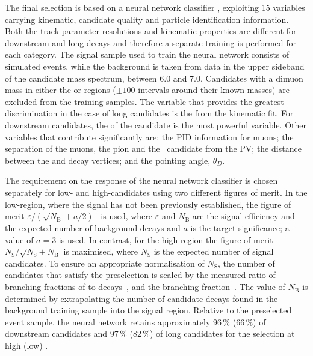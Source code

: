  The final selection is based on a neural network classifier
 \cite{Feindt:2006pm,feindt-2004}, exploiting 15 variables carrying
 kinematic, candidate quality and particle identification information.
 Both the track parameter resolutions and kinematic properties are different
 for downstream and long \Lz decays and therefore a separate training is
 performed for each category.  The signal sample used to train the neural
 network consists of simulated \decay{\Lb}{\Lz\mumu} events, while the
 background is taken from data in the upper sideband of the \Lb
 candidate mass spectrum, between 6.0 and 7.0\gevcc. Candidates with a
 dimuon mass in either the \jpsi or \psitwos regions ($\pm 100$\mevcc
 intervals around their known masses)
 are excluded from the training samples.  The variable that provides the greatest
 discrimination in the case of long candidates is the \chisq from the
 kinematic fit.  For downstream candidates, the \pt of the \Lz
 candidate is the most powerful variable.  Other variables that
 contribute significantly are: the PID information for muons; the
 separation of the muons, the pion and the \Lb\ candidate from the PV;
 the distance between the \Lz and \Lb decay vertices; and the pointing
 angle, $\theta_D$.
 
 The requirement on the response of the neural network classifier is
 chosen separately for low- and high-\qsq candidates using two
 different figures of merit.  In the low-\qsq region, where the signal
 has not been previously established, the figure of merit $\varepsilon
 /(\sqrt{N_{\mathrm{B}}} + a/2)$~\cite{Punzi:2003bu} is used, where
 $\varepsilon$ and $N_{\mathrm{B}}$ are the signal efficiency and the
 expected number of background decays and $a$ is the target
 significance; a value of $a = 3$ is used.  In contrast, for the
 high-\qsq region the figure of merit
 $N_{\mathrm{S}}/\sqrt{N_{\mathrm{S}}+N_{\mathrm{B}}}$ is maximised,
 where $N_{\mathrm{S}}$ is the expected number of signal candidates.
 To ensure an appropriate normalisation of $N_{\mathrm{S}}$, the
 number of \decay{\Lb}{\jpsi\Lz} candidates that satisfy the
 preselection is scaled by the measured ratio of branching fractions
 of \decay{\Lb}{\Lz\mumu} to \decay{\Lb}{\jpsi(\to\mumu)\Lz}
 decays~\cite{LHCB-PAPER-2013-025}, and the \decay{\jpsi}{\mumu}
 branching fraction~\cite{Agashe:2014kda}.  The value of
 $N_\mathrm{B}$ is determined by extrapolating the number of candidate
 decays found in the background training sample into the signal
 region.  Relative to the preselected event sample, the neural network
 retains approximately 96\,\% (66\,\%) of downstream candidates and
 97\,\% (82\,\%) of long candidates for the selection at high (low)
 \qsq.

